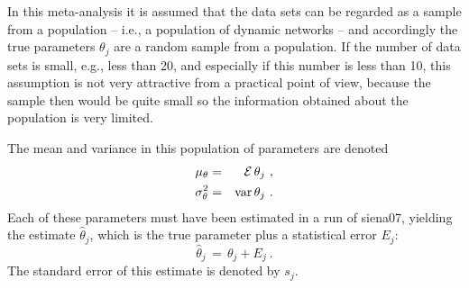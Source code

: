 \documentclass[a4paper,fleqn,11pt]{article}
\newcommand{\var}{\mbox{var}}
\newcommand{\+}{\, + \,}
\newcommand{\E}{\mbox{$\cal E$}}
\begin{document}
In this meta-analysis it is assumed that the data sets can be
regarded as a sample from a population -- i.e., a population
of dynamic networks -- and accordingly the true parameters
$\theta_j$  are a random sample from a population.
If the number of data sets is small, e.g., less than 20,
and especially if this number is less than 10,
this assumption is not very attractive from a practical point of view,
because the sample then would be quite small
so the information obtained about the population is very limited.

The mean and variance in this population of parameters are denoted
\begin{eqnarray*}
 \mu_\theta &=& \E\, \theta_j \ , \\
 \sigma^2_\theta &=& \var\, \theta_j \ .
\end{eqnarray*}
Each of these parameters must have been estimated in a run of
\textsf{siena07}, yielding the estimate $\hat\theta_j$,
which is the true parameter plus a statistical error $E_j$:
\[
\hat\theta_j \,=\, \theta_j + E_j \ .
\]
The standard error of this estimate is denoted by $s_j$.
\end{document}
